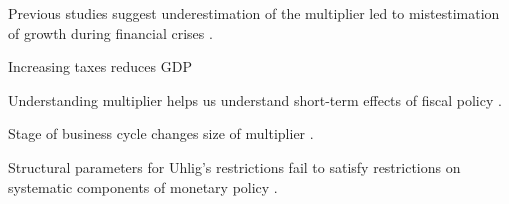 
Previous studies suggest underestimation of the multiplier led to mistestimation of growth during financial crises \parencite{blanchard2013growth}.  

Increasing taxes reduces GDP \parencite{barro2011macroeconomic}

Understanding multiplier helps us understand short-term effects of fiscal policy \parencite{eyraud2013challenge}.

Stage of business cycle changes size of multiplier \parencite{baum2012fiscal}.


Structural parameters for Uhlig's restrictions fail to satisfy restrictions on systematic components of monetary policy \parencite{arias2019systematic}.





